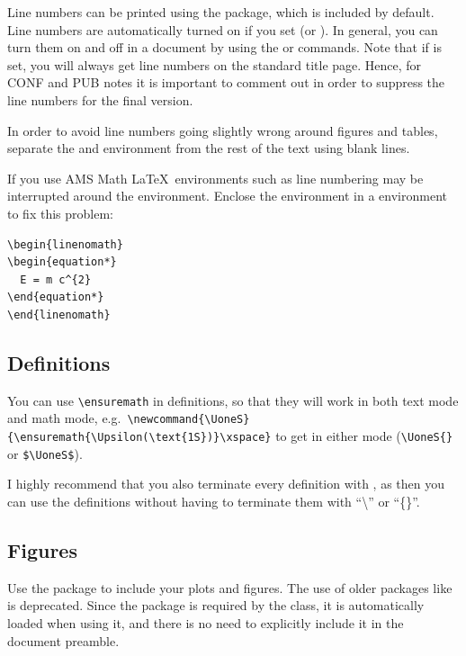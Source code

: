 Line numbers can be printed using the  package, 
which is included by default.
Line numbers are automatically turned on if you set  (or ).
In general, you can turn them on and off in a document by using the  or  commands.
Note that if  is set, you will always get line numbers on the standard title page.
Hence, for CONF and PUB notes it is important to comment out  in order to suppress the line numbers for the final version.

In order to avoid line numbers going slightly wrong around figures and tables,
separate the  and  environment from the rest of the text using blank lines.

If you use AMS Math \LaTeX\ environments such as  line numbering may be interrupted around the environment.
Enclose the environment in a  environment to fix this problem:
\begin{verbatim}
\begin{linenomath}
\begin{equation*}
  E = m c^{2}
\end{equation*}
\end{linenomath}
\end{verbatim}


\subsection{Definitions}

You can use \verb|\ensuremath| in definitions, so that they will work
in both text mode and math mode, e.g.\
\verb|\newcommand{\UoneS}{\ensuremath{\Upsilon(\text{1S})}\xspace}| to get
\UoneS in either mode (\verb|\UoneS{}| or \verb|$\UoneS$|).

I highly recommend that you also terminate every definition with ,
as then you can use the definitions without having to terminate them with
\enquote{\textbackslash\textvisiblespace} or \enquote{\{\}}.


\subsection{Figures}

Use the  package to include your plots and figures. 
The use of older packages like \Package{espfig} is deprecated.
Since the  package is required by the 
class, it is automatically loaded when using it, and there is no need
to explicitly include it in the document preamble.

